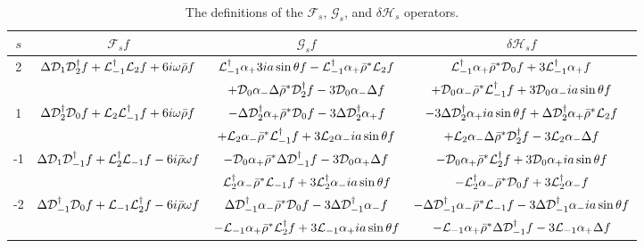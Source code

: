 \begin{refsection}
\begin{table}[h]
\begin{center}
    \begin{tabular}{ | c | c | c |  c|}
    \hline
    $s$ & $\mathcal{F}_s f$ & $\mathcal{G}_s f$ & $\delta\mathcal{H}_s f$ \\ \hline
  2 & $ \Delta \mathcal{D}_1\mathcal{D}_2^\dagger f +\mathcal{L}_{-1}^\dagger\mathcal{L}_2 f+6i\omega\bar\rho f$
 & $\mathcal{L}_{-1}^\dagger \alpha_+3ia\sin\theta f-\mathcal{L}_{-1}^\dagger \alpha_+\bar{\rho}^*\mathcal{L}_2 f$ & $\mathcal{L}_{-1}^\dagger\alpha_+\bar{\rho}^*\mathcal{D}_0f+3\mathcal{L}_{-1}^\dagger\alpha_+f $\\ & &$+\mathcal{D}_0\alpha_-\Delta\bar{\rho}^*\mathcal{D}_2^\dagger f-3\mathcal{D}_0\alpha_- \Delta f$ & $+\mathcal{D}_0\alpha_-\bar{\rho}^*\mathcal{L}_{-1}^\dagger f+3\mathcal{D}_0\alpha_-ia\sin\theta f$  \\ \hline
    1 & $ \Delta \mathcal{D}_2^\dagger\mathcal{D}_0 f +\mathcal{L}_{2}\mathcal{L}_{-1}^\dagger f+6i\omega\bar\rho f$ & $-\Delta\mathcal{D}_2^\dagger\alpha_+\bar{\rho}^*\mathcal{D}_0f-3\Delta\mathcal{D}_2^\dagger\alpha_+f$ & $-3\Delta\mathcal{D}_2^\dagger\alpha_+ia\sin\theta f+\Delta\mathcal{D}_2^\dagger\alpha_+\bar{\rho}^*\mathcal{L}_2f$ \\ & &$+\mathcal{L}_2\alpha_-\bar{\rho}^*\mathcal{L}_{-1}^\dagger f+3\mathcal{L}_2\alpha_-ia\sin\theta f$ & $+\mathcal{L}_2\alpha_-\Delta\bar{\rho}^*\mathcal{D}_2^\dagger f-3\mathcal{L}_2\alpha_-\Delta f $\\ \hline
    -1 & $\Delta\mathcal{D}_1\mathcal{D}_{-1}^\dagger f+\mathcal{L}_2^\dagger\mathcal{L}_{-1}f-6i\bar{\rho}\omega f$ & $- \mathcal{D}_0 \alpha_+ \bar{\rho}^* \Delta \mathcal{D}_{-1}^\dagger f -3 \mathcal{D}_0 \alpha_+ \Delta f$ & $-\mathcal{D}_0 \alpha_+ \bar{\rho}^* \mathcal{L}_2^\dagger f +3 \mathcal{D}_0 \alpha_+ ia \sin \theta f$ \\ & &$\mathcal{L}_2^\dagger \alpha_- \bar{\rho}^* \mathcal{L}_{-1} f +3 \mathcal{L}_2^\dagger \alpha_- i a\sin\theta f$ &$-\mathcal{L}_2^\dagger \alpha_- \bar{\rho}^* \mathcal{D}_0 f +3 \mathcal{L}_2^\dagger \alpha _- f$ \\ \hline
    -2 & $\Delta\mathcal{D}_{-1}^\dagger\mathcal{D}_0 f+\mathcal{L}_{-1}\mathcal{L}_2^\dagger f-6i\bar{\rho}\omega f$& $\Delta \mathcal{D}_{-1}^\dagger \alpha_-\bar{\rho}^*\mathcal{D}_0 f -3\Delta \mathcal{D}_{-1}^\dagger \alpha_- f$ & $-\Delta \mathcal{D}_{-1}^\dagger \alpha_- \bar{\rho}^* \mathcal{L}_{-1} f -3 \Delta \mathcal{D}_{-1}^\dagger \alpha_- i a \sin \theta f$ \\ &  &$- \mathcal{L}_{-1}\alpha_+ \bar{\rho}^* \mathcal{L}_2 ^\dagger f +3 \mathcal{L}_{-1} \alpha_+ i a \sin \theta f$ & $-\mathcal{L}_{-1} \alpha_+ \bar{\rho}^* \Delta \mathcal{D}_{-1}^\dagger f -3\mathcal{L}_{-1} \alpha_+ \Delta f$ \\ \hline
    \end{tabular} 
\end{center} 
\caption{The definitions of the $\mathcal{F}_s$, $\mathcal{G}_s$, and $\delta \mathcal{H}_s$ operators.}
\label{table}
\end{table}



\printbibliography[heading=subbibliography]
\end{refsection}